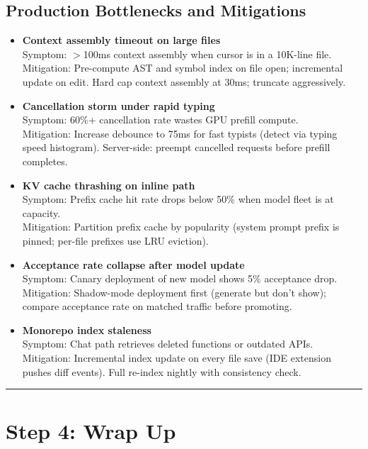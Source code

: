 \subsection*{Production Bottlenecks and Mitigations}

\begin{itemize}
  \item \textbf{Context assembly timeout on large files}\\
    Symptom: $>$100ms context assembly when cursor is in a 10K-line file.\\
    Mitigation: Pre-compute AST and symbol index on file open; incremental update on edit. Hard cap context assembly at 30ms; truncate aggressively.

  \item \textbf{Cancellation storm under rapid typing}\\
    Symptom: 60\%+ cancellation rate wastes GPU prefill compute.\\
    Mitigation: Increase debounce to 75ms for fast typists (detect via typing speed histogram). Server-side: preempt cancelled requests before prefill completes.

  \item \textbf{KV cache thrashing on inline path}\\
    Symptom: Prefix cache hit rate drops below 50\% when model fleet is at capacity.\\
    Mitigation: Partition prefix cache by popularity (system prompt prefix is pinned; per-file prefixes use LRU eviction).

  \item \textbf{Acceptance rate collapse after model update}\\
    Symptom: Canary deployment of new model shows 5\% acceptance drop.\\
    Mitigation: Shadow-mode deployment first (generate but don't show); compare acceptance rate on matched traffic before promoting.

  \item \textbf{Monorepo index staleness}\\
    Symptom: Chat path retrieves deleted functions or outdated APIs.\\
    Mitigation: Incremental index update on every file save (IDE extension pushes diff events). Full re-index nightly with consistency check.
\end{itemize}

\bigskip\hrule\bigskip

\section*{Step 4: Wrap Up}

